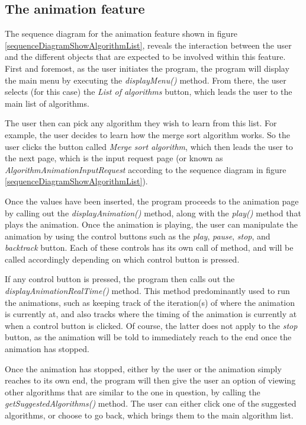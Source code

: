 \subsection{The animation feature}
The sequence diagram for the animation feature shown in figure \ref{sequenceDiagramShowAlgorithmList}, reveals the interaction between the user and the different objects that are expected to be involved within this feature. First and foremost, as the user initiates the program, the program will display the main menu by executing the \textit{displayMenu()} method. From there, the user selects (for this case) the \textit{List of algorithms} button, which leads the user to the main list of algorithms.

The user then can pick any algorithm they wish to learn from this list. For example, the user decides to learn how the merge sort algorithm works. So the user clicks the button called \textit{Merge sort algorithm}, which then leads the user to the next page, which is the input request page (or known as \textit{AlgorithmAnimationInputRequest} according to the sequence diagram in figure \ref{sequenceDiagramShowAlgorithmList}).

Once the values have been inserted, the program proceeds to the animation page by calling out the \textit{displayAnimation()} method, along with the \textit{play()} method that plays the animation. Once the animation is playing, the user can manipulate the animation by using the control buttons such as the \textit{play}, \textit{pause}, \textit{stop}, and \textit{backtrack} button. Each of these controls has its own call of method, and will be called accordingly depending on which control button is pressed. 

If any control button is pressed, the program then calls out the \textit{displayAnimationRealTime()} method. This method predominantly used to run the animations, such as keeping track of the iteration(s) of where the animation is currently at, and also tracks where the timing of the animation is currently at when a control button is clicked. Of course, the latter does not apply to the \textit{stop} button, as the animation will be told to immediately reach to the end once the animation has stopped. 

Once the animation has stopped, either by the user or the animation simply reaches to its own end, the program will then give the user an option of viewing other algorithms that are similar to the one in question, by calling the \textit{getSuggestedAlgorithms()} method. The user can either click one of the suggested algorithms, or choose to go back, which brings them to the main algorithm list.

